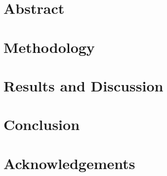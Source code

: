\documentclass{pv_phd}
\begin{document}
\chapter*{Abstract}
\blindtext[2] %






\chapter{Methodology}
\blindtext[5] %

\chapter{Results and Discussion}
\blindtext[7] %

\chapter{Conclusion}
\blindtext[3] %

\chapter*{Acknowledgements}
\thispagestyle{empty}
\blindtext[1] %

\clearpage


\clearpage
\end{document}
